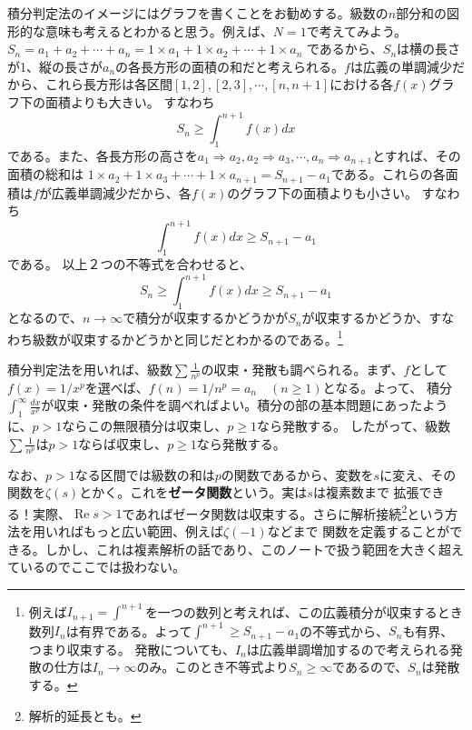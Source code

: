 \documentclass[a4j,dvipdfmx]{jsarticle}
\renewcommand{\Re}{\operatorname{Re}}
\begin{document}
                積分判定法のイメージにはグラフを書くことをお勧めする。級数の$n$部分和の図形的な意味も考えるとわかると思う。例えば、$N=1$で考えてみよう。$S_n=a_1+a_2+\cdots +a_n=1\times a_1 + 1\times a_2 +\cdots+1\times a_n$
                であるから、$S_n$は横の長さが1、縦の長さが$a_n$の各長方形の面積の和だと考えられる。$f$は広義の単調減少だから、これら長方形は各区間$[1,2],[2,3],\cdots,[n,n+1]$における各$f(x)$グラフ下の面積よりも大きい。
                すなわち
                \begin{equation*}
                    S_n \geq \int_1^{n+1} f(x)dx
                \end{equation*}
                である。また、各長方形の高さを$a_1\Rightarrow a_2,a_2\Rightarrow a_3,\cdots,a_{n}\Rightarrow a_{n+1}$とすれば、その面積の総和は
                $1\times a_{2}+1\times a_3+\cdots+1\times a_{n+1}=S_{n+1} - a_1$である。これらの各面積は$f$が広義単調減少だから、各$f(x)$のグラフ下の面積よりも小さい。
                すなわち
                \begin{equation*}
                    \int_{1}^{n+1}f(x)dx \geq S_{n+1}-a_1
                \end{equation*}
                である。
                \clearpage
                以上２つの不等式を合わせると、
                \begin{equation*}
                    S_n \geq \int_{1}^{n+1}f(x)dx \geq S_{n+1}-a_1
                \end{equation*}
                となるので、$n\to \infty$で積分が収束するかどうかが$S_n$が収束するかどうか、すなわち級数が収束するかどうかと同じだとわかるのである。\footnote{例えば$I_{n+1}=\int^{n+1}$を一つの数列と考えれば、この広義積分が収束するとき数列$I_n$は有界である。よって$\int^{n+1}\geq S_{n+1}-a_1$の不等式から、$S_n$も有界、つまり収束する。
                発散についても、$I_n$は広義単調増加するので考えられる発散の仕方は$I_n\to \infty$のみ。このとき不等式より$S_n \geq \infty$であるので、$S_n$は発散する。}

                積分判定法を用いれば、級数$\displaystyle \sum\frac{1}{n^p}$の収束・発散も調べられる。まず、$f$として$f(x)=1/x^p$を選べば、$f(n)=1/n^p =a_n \quad (n\geq 1)$となる。よって、
                積分$\displaystyle \int_{1}^{\infty}\frac{dx}{x^p}$が収束・発散の条件を調べればよい。積分の部の基本問題にあったように、$p>1$ならこの無限積分は収束し、$p\geq 1$なら発散する。
                したがって、級数$\displaystyle \sum \frac{1}{n^p}$は$p>1$ならば収束し、$p\geq 1$なら発散する。

                なお、$p>1$なる区間では級数の和は$p$の関数であるから、変数を$s$に変え、その関数を$\zeta(s)$とかく。これを\textbf{ゼータ関数}という。実は$s$は複素数まで
                拡張できる！実際、$\Re s > 1$であればゼータ関数は収束する。さらに解析接続\footnote{解析的延長とも。}という方法を用いればもっと広い範囲、例えば$\zeta(-1)$などまで
                関数を定義することができる。しかし、これは複素解析の話であり、このノートで扱う範囲を大きく超えているのでここでは扱わない。  
                
\end{document}
